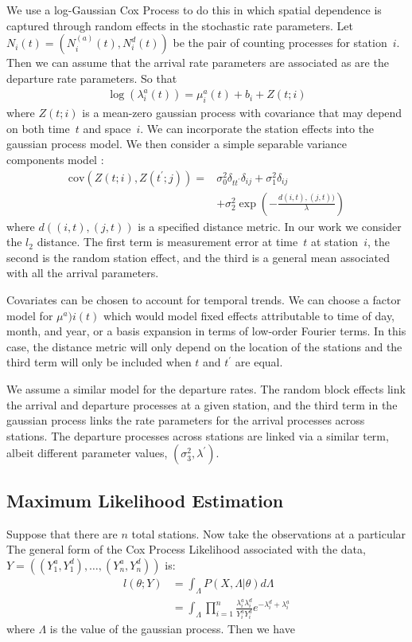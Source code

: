 \documentclass{acm_proc_article-sp}
\begin{document}
We use a log-Gaussian Cox Process to do this in which spatial dependence is captured through random effects in the stochastic rate parameters.  Let $N_i (t) = (N_i^(a) (t), N_i^{d} (t))$ be the pair of counting processes for station~$i$.  Then we can assume that the arrival rate parameters are associated as are the departure rate parameters.  So that
\begin{align}
\log \left( \lambda_i^{a} (t) \right) = \mu^{a}_i(t) + b_i + Z(t;i)
\end{align}
\noindent where $Z(t;i)$ is a mean-zero gaussian process with covariance that may depend on both time~$t$ and space~$i$.  We can incorporate the station effects into the gaussian process model.  We then consider a simple separable variance components model :
\begin{align*}
\text{cov} ( Z(t;i) , Z(t^\prime; j) ) =& \sigma_0^2 \delta_{t t^\prime}  \delta_{i j} + \sigma_1^2  \delta_{i j} \\
&+ \sigma_2^2 \exp \left( -\frac{ d(i,t),(j,t)) }{\lambda} \right)
\end{align*}
\noindent where $d ( (i,t) , (j,t))$ is a specified distance metric. In our work we consider the $l_2$ distance.  The first term is measurement error at time~$t$ at station~$i$, the second is the random station effect, and the third is a general mean associated with all the arrival parameters.

Covariates can be chosen to account for temporal trends.  We can choose a factor model for $\mu^{a})i (t)$ which would model fixed effects attributable to time of day, month, and year, or a basis expansion in terms of low-order Fourier terms.  In this case, the distance metric will only depend on the location of the stations and the third term will only be included when $t$ and $t^\prime$ are equal.

We assume a similar model for the departure rates.  The random block effects link the arrival and departure processes at a given station, and the third term in the gaussian process links the rate parameters for the arrival processes across stations.  The departure processes across stations are linked via a similar term, albeit different parameter values, $(\sigma_3^2, \lambda^\prime)$.

\subsection{Maximum Likelihood Estimation}

Suppose that there are $n$ total stations. Now take the observations at a particular The general form of the Cox Process Likelihood associated with the data, \\ $Y = \left( (Y_1^{a}, Y_1^{d}), \ldots, (Y_n^{a}, Y_n^{d}) \right) $ is:
\begin{align}
l( \theta; Y ) &= \int_{\Lambda} P(X,  \Lambda | \theta) d \Lambda \\
&= \int_{\Lambda} \prod_{i=1}^n \frac{\lambda_i^{a} \lambda_i^{d}}{Y_i^{a} Y_i^{d}} e^{-\lambda_i^{d}+\lambda_i^{a}}
\end{align}
\noindent where $\Lambda$ is the value of the gaussian process.  Then we have 
\end{document}
